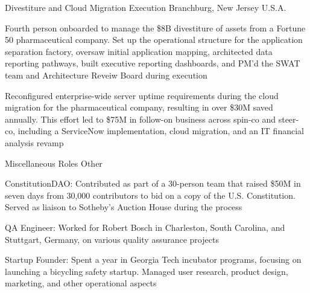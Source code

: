 \begin{cventries}
  \cventry
    {Divestiture and Cloud Migration Execution} %
    {} %
    {} %
    {Branchburg, New Jersey U.S.A.} %
    {
      \begin{cvitems} %
        \item {Fourth person onboarded to manage the \$8B divestiture of assets from a Fortune 50 pharmaceutical company. Set up the operational structure for the application separation factory, oversaw initial application mapping, architected data reporting pathways, built executive reporting dashboards, and PM’d the SWAT team and Architecture Reveiw Board during execution}
        \item {Reconfigured enterprise-wide server uptime requirements during the cloud migration for the pharmaceutical company, resulting in over \$30M saved annually. This effort led to \$75M in follow-on business across spin-co and steer-co, including a ServiceNow implementation, cloud migration, and an IT financial analysis revamp}
      \end{cvitems}
    }

  \cventry
    {Miscellaneous Roles} %
    {Other} %
    {} %
    {} %
    {
      \begin{cvitems} %
        \item {ConstitutionDAO: Contributed as part of a 30-person team that raised \$50M in seven days from 30,000 contributors to bid on a copy of the U.S. Constitution. Served as liaison to Sotheby’s Auction House during the process}
        \item {QA Engineer: Worked for Robert Bosch in Charleston, South Carolina, and Stuttgart, Germany, on various quality assurance projects}
        \item {Startup Founder: Spent a year in Georgia Tech incubator programs, focusing on launching a bicycling safety startup. Managed user research, product design, marketing, and other operational aspects}
      \end{cvitems}
    }

\end{cventries}

